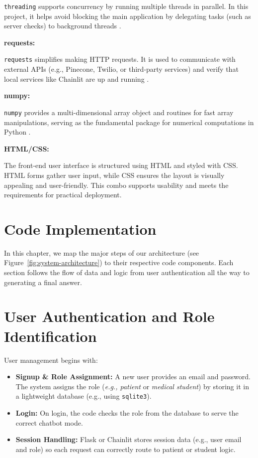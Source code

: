 \noindent
\texttt{threading} supports concurrency by running multiple threads in parallel. In this project, it helps 
avoid blocking the main application by delegating tasks (such as server checks) to background threads \cite{threading}.

\vspace{0.4cm}
\noindent\textbf{requests:}

\noindent
\texttt{requests} simplifies making HTTP requests. It is used to communicate with external APIs (e.g., Pinecone, 
Twilio, or third-party services) and verify that local services like Chainlit are up and running \cite{requests}.

\vspace{0.4cm}
\noindent\textbf{numpy:}

\noindent
\texttt{numpy} provides a multi-dimensional array object and routines for fast array manipulations, 
serving as the fundamental package for numerical computations in Python \cite{numpy}.


\vspace{1cm}
\noindent\textbf{HTML/CSS:}

The front-end user interface is structured using HTML and styled with CSS. HTML forms gather user input, 
while CSS ensures the layout is visually appealing and user-friendly. This combo supports usability 
and meets the requirements for practical deployment.


\section{Code Implementation}

In this chapter, we map the major steps of our architecture (see Figure~\ref{fig:system-architecture}) to their respective code components. Each section follows the flow of data and logic from user authentication all the way to generating a final answer.

\section{User Authentication and Role Identification}
\label{sec:auth-role}
User management begins with:
\begin{itemize}
    \item \textbf{Signup \& Role Assignment:} A new user provides an email and password. The system assigns the role (\textit{e.g., patient} or \textit{medical student}) by storing it in a lightweight database (e.g., using \texttt{sqlite3}).
    \item \textbf{Login:} On login, the code checks the role from the database to serve the correct chatbot mode.
    \item \textbf{Session Handling:} Flask or Chainlit stores session data (e.g., user email and role) so each request can correctly route to patient or student logic.
\end{itemize}

